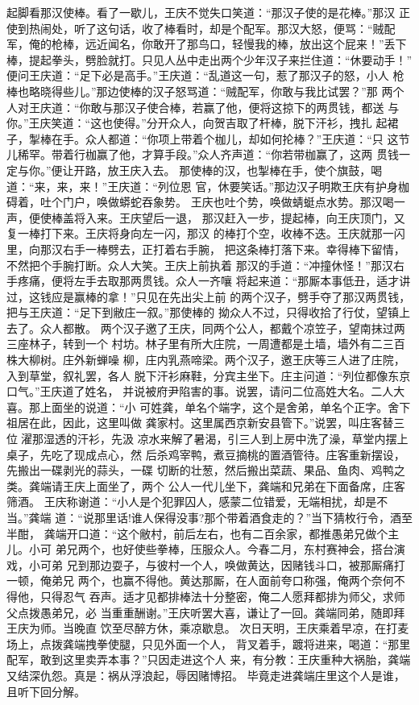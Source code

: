 起脚看那汉使棒。看了一歇儿，王庆不觉失口笑道：“那汉子使的是花棒。”那汉
正使到热闹处，听了这句话，收了棒看时，却是个配军。那汉大怒，便骂：“贼配
军，俺的枪棒，远近闻名，你敢开了那鸟口，轻慢我的棒，放出这个屁来！”丢下
棒，提起拳头，劈脸就打。只见人丛中走出两个少年汉子来拦住道：“休要动手！”
便问王庆道：“足下必是高手。”王庆道：“乱道这一句，惹了那汉子的怒，小人
枪棒也略晓得些儿。”那边使棒的汉子怒骂道：“贼配军，你敢与我比试罢？”那
两个人对王庆道：“你敢与那汉子使合棒，若赢了他，便将这掠下的两贯钱，都送
与你。”王庆笑道：“这也使得。”分开众人，向贺吉取了杆棒，脱下汗衫，拽扎
起裙子，掣棒在手。众人都道：“你项上带着个枷儿，却如何抡棒？”王庆道：“只
这节儿稀罕。带着行枷赢了他，才算手段。”众人齐声道：“你若带枷赢了，这两
贯钱一定与你。”便让开路，放王庆入去。
那使棒的汉，也掣棒在手，使个旗鼓，喝道：“来，来，来！”王庆道：“列位恩
官，休要笑话。”那边汉子明欺王庆有护身枷碍着，吐个门户，唤做蟒蛇吞象势。
王庆也吐个势，唤做蜻蜓点水势。那汉喝一声，便使棒盖将入来。王庆望后一退，
那汉赶入一步，提起棒，向王庆顶门，又复一棒打下来。王庆将身向左一闪，那汉
的棒打个空，收棒不迭。王庆就那一闪里，向那汉右手一棒劈去，正打着右手腕，
把这条棒打落下来。幸得棒下留情，不然把个手腕打断。众人大笑。王庆上前执着
那汉的手道：“冲撞休怪！”那汉右手疼痛，便将左手去取那两贯钱。众人一齐嚷
将起来道：“那厮本事低丑，适才讲过，这钱应是赢棒的拿！”只见在先出尖上前
的两个汉子，劈手夺了那汉两贯钱，把与王庆道：“足下到敝庄一叙。”那使棒的
拗众人不过，只得收拾了行仗，望镇上去了。众人都散。
两个汉子邀了王庆，同两个公人，都戴个凉笠子，望南抹过两三座林子，转到一个
村坊。林子里有所大庄院，一周遭都是土墙，墙外有二三百株大柳树。庄外新蝉噪
柳，庄内乳燕啼梁。两个汉子，邀王庆等三人进了庄院，入到草堂，叙礼罢，各人
脱下汗衫麻鞋，分宾主坐下。庄主问道：“列位都像东京口气。”王庆道了姓名，
并说被府尹陷害的事。说罢，请问二位高姓大名。二人大喜。那上面坐的说道：“小
可姓龚，单名个端字，这个是舍弟，单名个正字。舍下祖居在此，因此，这里叫做
龚家村。这里属西京新安县管下。”说罢，叫庄客替三位濯那湿透的汗衫，先汲
凉水来解了暑渴，引三人到上房中洗了澡，草堂内摆上桌子，先吃了现成点心，然
后杀鸡宰鸭，煮豆摘桃的置酒管待。庄客重新摆设，先搬出一碟剥光的蒜头，一碟
切断的壮葱，然后搬出菜蔬、果品、鱼肉、鸡鸭之类。龚端请王庆上面坐了，两个
公人一代儿坐下，龚端和兄弟在下面备席，庄客筛酒。
王庆称谢道：“小人是个犯罪囚人，感蒙二位错爱，无端相扰，却是不当。”龚端
道：“说那里话!谁人保得没事?那个带着酒食走的？”当下猜枚行令，酒至半酣，
龚端开口道：“这个敝村，前后左右，也有二百余家，都推愚弟兄做个主儿。小可
弟兄两个，也好使些拳棒，压服众人。今春二月，东村赛神会，搭台演戏，小可弟
兄到那边耍子，与彼村一个人，唤做黄达，因赌钱斗口，被那厮痛打一顿，俺弟兄
两个，也赢不得他。黄达那厮，在人面前夸口称强，俺两个奈何不得他，只得忍气
吞声。适才见都排棒法十分整密，俺二人愿拜都排为师父，求师父点拨愚弟兄，必
当重重酬谢。”王庆听罢大喜，谦让了一回。龚端同弟，随即拜王庆为师。当晚直
饮至尽醉方休，乘凉歇息。
次日天明，王庆乘着早凉，在打麦场上，点拨龚端拽拳使腿，只见外面一个人，
背叉着手，踱将进来，喝道：“那里配军，敢到这里卖弄本事？”只因走进这个人
来，有分教：王庆重种大祸胎，龚端又结深仇怨。真是：祸从浮浪起，辱因赌博招。
毕竟走进龚端庄里这个人是谁，且听下回分解。